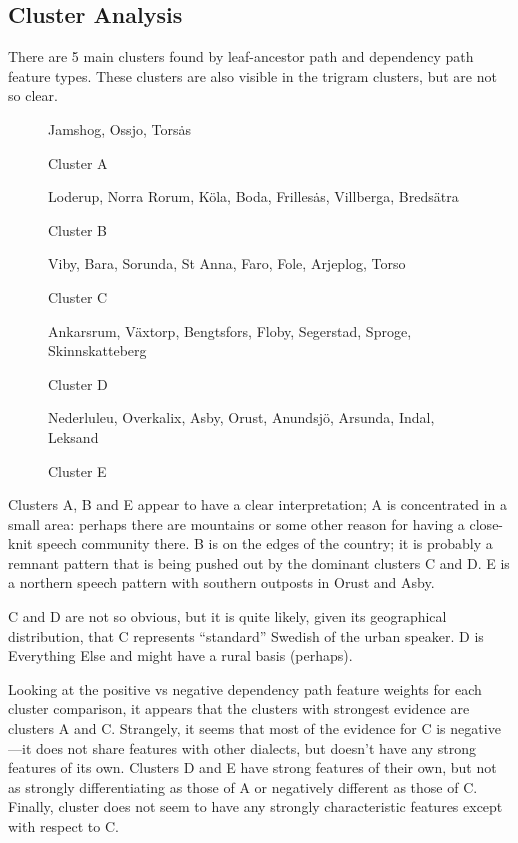 \subsection{Cluster Analysis}

There are 5 main clusters found by leaf-ancestor path and dependency
path feature types. These clusters are also visible in the trigram
clusters, but are not so clear.

\begin{figure}
  Jamshog, Ossjo, Tors\.as
\label{cluster-a}
\caption{Cluster A}
\end{figure}

\begin{figure}
  Loderup, Norra Rorum, K\"ola, Boda, Frilles\.as, Villberga,
  Breds\"atra
\label{cluster-b}
\caption{Cluster B}
\end{figure}

\begin{figure}
  Viby, Bara, Sorunda, St Anna, Faro, Fole, Arjeplog, Torso
\label{cluster-c}
\caption{Cluster C}
\end{figure}

\begin{figure}
  Ankarsrum, V\"axtorp, Bengtsfors, Floby, Segerstad, Sproge,
  Skinnskatteberg
\label{cluster-d}
\caption{Cluster D}
\end{figure}

\begin{figure}
  Nederluleu, Overkalix, Asby, Orust, Anundsj\"o, Arsunda, Indal,
  Leksand
\label{cluster-e}
\caption{Cluster E}
\end{figure}

Clusters A, B and E appear to have a clear interpretation; A is
concentrated in a small area: perhaps there are mountains or some
other reason for having a close-knit speech community there. B is on
the edges of the country; it is probably a remnant pattern that is
being pushed out by the dominant clusters C and D. E is a
northern speech pattern with southern outposts in Orust and Asby.

C and D are not so obvious, but it is quite likely, given its
geographical distribution, that C represents
``standard'' Swedish of the urban speaker. D is Everything Else and
might have a rural basis (perhaps).

Looking at the positive vs negative dependency path feature weights
for each cluster comparison, it appears that the clusters with
strongest evidence are clusters A and C. Strangely, it seems that most
of the evidence for C is negative---it does not share features with
other dialects, but doesn't have any strong features of its own.
Clusters D and E have strong features of their own, but not as
strongly differentiating as those of A or negatively different as
those of C. Finally, cluster does not seem to have any strongly
characteristic features except with respect to C.


